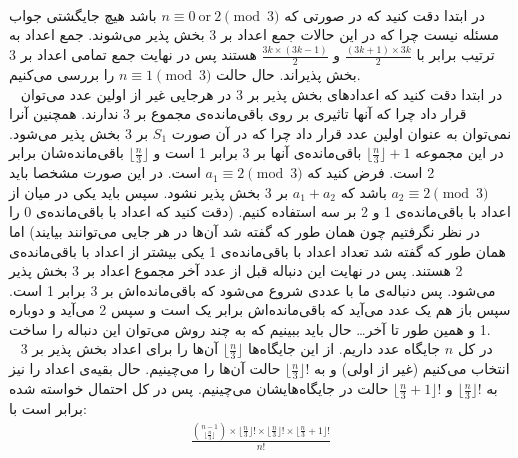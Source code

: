 \\
در ابتدا دقت کنید که در صورتی که
$n \equiv 0 ~ \text{or} ~ 2\pmod{3}$
باشد هیچ جایگشتی جواب مسئله نیست چرا که در این حالات جمع اعداد بر 3 بخش پذیر می‌شوند.
جمع اعداد به ترتیب برابر با
$\frac{(3k + 1) \times 3k}{2}$
و
$\frac{3k \times (3k - 1)}{2}$
هستند پس در نهایت جمع تمامی اعداد بر 3 بخش پذیر‌اند.
حال حالت
$n \equiv 1\pmod{3}$
را بررسی می‌کنیم.
\\~
در ابتدا دقت کنید که اعداد‌های بخش پذیر بر 3 در هرجایی غیر از اولین عدد می‌توان قرار داد چرا که
آنها تاثیری بر روی باقی‌مانده‌ی مجموع بر 3 ندارند.
همچنین آنرا نمی‌توان به عنوان اولین عدد قرار داد چرا که در آن صورت
$S_1$
بر 3 بخش پذیر می‌شود.
در این مجموعه
$\lfloor \frac{n}{3} \rfloor + 1$
باقی‌مانده‌ی آنها بر 3 برابر 1 است و 
$\lfloor \frac{n}{3} \rfloor$
باقی‌مانده‌شان برابر 2 است.
فرض کنید که
$a_1 \equiv 2\pmod{3}$
است. در این صورت مشخصا باید
$a_2 \equiv 2\pmod{3}$
باشد که
$a_1 + a_2$
بر 3 بخش پذیر نشود.
سپس باید یکی در میان از اعداد با باقی‌مانده‌ی 1 و 2 بر سه استفاده کنیم.
(دقت کنید که اعداد با باقی‌مانده‌ی 0 را در نظر نگرفتیم چون همان طور که گفته شد آن‌ها در هر جایی می‌توانند
بیایند)
اما همان طور که گفته شد تعداد اعداد با باقی‌مانده‌ی 1 یکی بیشتر از اعداد با باقی‌مانده‌ی 2 هستند.
پس در نهایت این دنباله قبل از عدد آخر مجموع اعداد بر 3 بخش پذیر می‌شود.
پس دنباله‌ی ما با عددی شروع می‌شود که باقی‌مانده‌اش بر 3 برابر 1 است.
سپس باز هم یک عدد می‌آید که باقی‌مانده‌اش برابر یک است و سپس 2 می‌آید و دوباره 1 و همین طور تا آخر\dots
حال باید ببینیم که به چند روش می‌توان این دنباله را ساخت.
\\~
در کل
$n$
جایگاه عدد داریم. از این جایگاه‌ها
$\lfloor \frac{n}{3} \rfloor$
آن‌ها را برای اعداد بخش پذیر بر 3 انتخاب می‌کنیم (غیر از اولی) و به
$\lfloor \frac{n}{3} \rfloor!$
حالت آن‌ها را می‌چینیم.
حال بقیه‌ی اعداد را نیز به
$\lfloor \frac{n}{3} \rfloor!$
و
$\lfloor \frac{n}{3} + 1 \rfloor!$
حالت در جایگاه‌هایشان می‌چینیم. پس در کل احتمال خواسته شده برابر است با:
\begin{gather*}
    \frac{{n - 1 \choose \lfloor \frac{n}{3} \rfloor} \times \lfloor \frac{n}{3} \rfloor! \times \lfloor \frac{n}{3} \rfloor! \times \lfloor \frac{n}{3} + 1 \rfloor!}{n!}
\end{gather*}